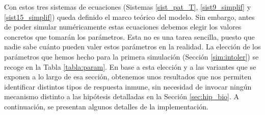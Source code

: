Con estos tres sistemas de ecuaciones (Sistemas \ref{sist_pat_T}, \ref{sist9_simplif} y \ref{sist15_simplif}) queda definido el marco teórico del modelo. Sin embargo, antes de poder simular numéricamente estas ecuaciones debemos elegir los valores concretos que tomarán los parámetros. Esta no es una tarea sencilla, puesto que nadie sabe cuánto pueden valer estos parámetros en la realidad. La elección de los parámetros que hemos hecho para la primera simulación (Sección \ref{sim:intoler}) se recoge en la Tabla \ref{tabla:param}. En base a esta elección y a las variantes que se exponen a lo largo de esa sección, obtenemos unos resultados que nos permiten identificar distintos tipos de respuesta inmune, sin necesidad de invocar ningún mecanismo distinto a las hipótesis detalladas en la Sección \ref{sec:hip_bio}. A continuación, se presentan algunos detalles de la implementación.


